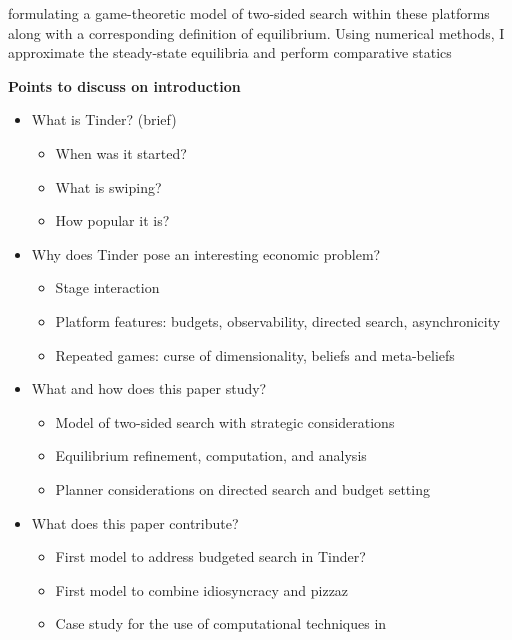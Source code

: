 formulating a game-theoretic model of two-sided search within these platforms along with a corresponding definition of equilibrium. 
Using numerical methods, I approximate the steady-state equilibria and perform comparative statics  



\textbf{Points to discuss on introduction}
\begin{itemize}
    \item What is Tinder? (brief)
    \begin{itemize}
        \item When was it started?
        \item What is swiping?
        \item How popular it is?
    \end{itemize}
    \item Why does Tinder pose an interesting economic problem?
    \begin{itemize}
        \item Stage interaction
        \item Platform features: budgets, observability, directed search, asynchronicity
        \item Repeated games: curse of dimensionality, beliefs and meta-beliefs
    \end{itemize}
    \item What and how does this paper study?
    \begin{itemize}
        \item Model of two-sided search with strategic considerations
        \item Equilibrium refinement, computation, and analysis
        \item Planner considerations on directed search and budget setting
    \end{itemize}
    \item What does this paper contribute?
    \begin{itemize}
        \item First model to address budgeted search in Tinder?
        \item First model to combine idiosyncracy and pizzaz
        \item Case study for the use of computational techniques in 
    \end{itemize}
\end{itemize}
